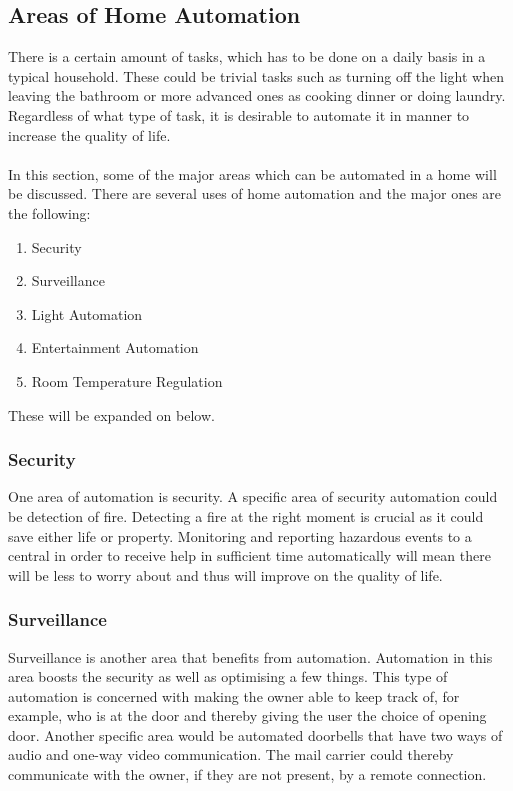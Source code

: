 \subsection{Areas of Home Automation}
\label{sec:Areas of Home Automation}
There is a certain amount of tasks, which has to be done on a daily basis in a typical household. These could be trivial tasks such as turning off the light when leaving the bathroom or more advanced ones as cooking dinner or doing laundry. Regardless of what type of task, it is desirable to automate it in manner to increase the quality of life.
\\\\
In this section, some of the major areas which can be automated in a home will be discussed. There are several uses of home automation and the major ones are the following:

\begin{enumerate}
  \item Security
  \item Surveillance
  \item Light Automation
  \item Entertainment Automation
  \item Room Temperature Regulation
\end{enumerate}
These will be expanded on below.

\subsubsection{Security}
\label{sub:Security}
One area of automation is security. A specific area of security automation could be detection of fire. Detecting a fire at the right moment is crucial as it could save either life or property. Monitoring and reporting hazardous events to a central in order to receive help in sufficient time automatically will mean there will be less to worry about and thus will improve on the quality of life.

\subsubsection{Surveillance}
\label{sub:Surveillance}
Surveillance is another area that benefits from automation. Automation in this area boosts the security as well as optimising a few things. This type of automation is concerned with making the owner able to keep track of, for example, who is at the door and thereby giving the user the choice of opening door. Another specific area would be automated doorbells that have two ways of audio and one-way video communication. The mail carrier could thereby communicate with the owner, if they are not present, by a remote connection.

